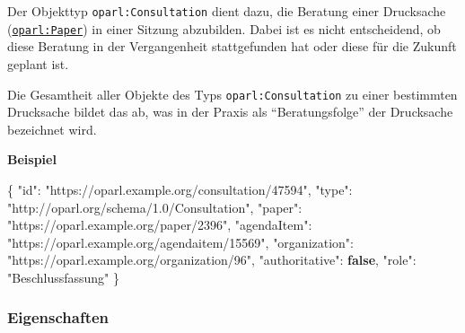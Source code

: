 \documentclass[,a4paper]{article}
\newenvironment{Shaded}{}{}
\newcommand{\KeywordTok}[1]{\textcolor[rgb]{0.00,0.44,0.13}{\textbf{{#1}}}}
\newcommand{\DataTypeTok}[1]{\textcolor[rgb]{0.56,0.13,0.00}{{#1}}}
\newcommand{\StringTok}[1]{\textcolor[rgb]{0.25,0.44,0.63}{{#1}}}
\newcommand{\FunctionTok}[1]{\textcolor[rgb]{0.02,0.16,0.49}{{#1}}}
\begin{document}
Der Objekttyp \texttt{oparl:Consultation} dient dazu, die Beratung einer
Drucksache (\hyperref[oparlux5fpaper]{\texttt{oparl:Paper}}) in einer
Sitzung abzubilden. Dabei ist es nicht entscheidend, ob diese Beratung
in der Vergangenheit stattgefunden hat oder diese für die Zukunft
geplant ist.

Die Gesamtheit aller Objekte des Typs \texttt{oparl:Consultation} zu
einer bestimmten Drucksache bildet das ab, was in der Praxis als
``Beratungsfolge'' der Drucksache bezeichnet wird.

\textbf{Beispiel}

\begin{Shaded}
\begin{Highlighting}[]
\FunctionTok{\{}
    \DataTypeTok{"id"}\FunctionTok{:} \StringTok{"https://oparl.example.org/consultation/47594"}\FunctionTok{,}
    \DataTypeTok{"type"}\FunctionTok{:} \StringTok{"http://oparl.org/schema/1.0/Consultation"}\FunctionTok{,}
    \DataTypeTok{"paper"}\FunctionTok{:} \StringTok{"https://oparl.example.org/paper/2396"}\FunctionTok{,}
    \DataTypeTok{"agendaItem"}\FunctionTok{:} \StringTok{"https://oparl.example.org/agendaitem/15569"}\FunctionTok{,}
    \DataTypeTok{"organization"}\FunctionTok{:} \StringTok{"https://oparl.example.org/organization/96"}\FunctionTok{,}
    \DataTypeTok{"authoritative"}\FunctionTok{:} \KeywordTok{false}\FunctionTok{,}
    \DataTypeTok{"role"}\FunctionTok{:} \StringTok{"Beschlussfassung"}
\FunctionTok{\}}
\end{Highlighting}
\end{Shaded}

\subsubsection{Eigenschaften}\label{eigenschaften-8}
\end{document}
